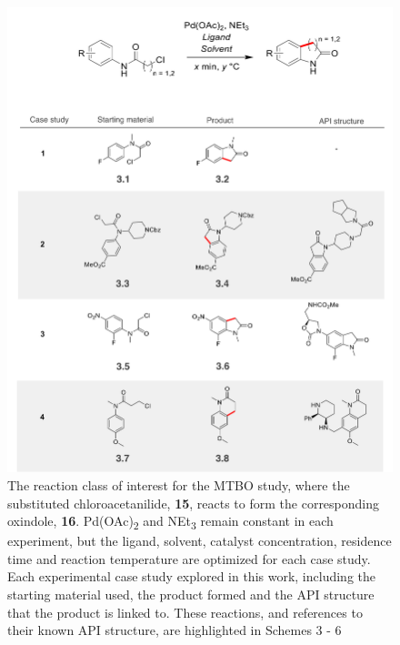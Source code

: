 \begin{figure}
    \centering
    \includegraphics[width=\textwidth]{gfx/Chapter03/ch_activation_case_studies.png}
    \caption{ The reaction class of interest for the MTBO study, where the substituted chloroacetanilide, \textbf{15}, reacts to form the corresponding oxindole, \textbf{16}. Pd(OAc)\textsubscript{2} and NEt\textsubscript{3} remain constant in each experiment, but the ligand, solvent, catalyst concentration, residence time and reaction temperature are optimized for each case study. Each experimental case study explored in this work, including the starting material used, the product formed and the API structure that the product is linked to. These reactions, and references to their known API structure, are highlighted in Schemes 3 - 6}
    \label{fig:ch_activation}
\end{figure}

